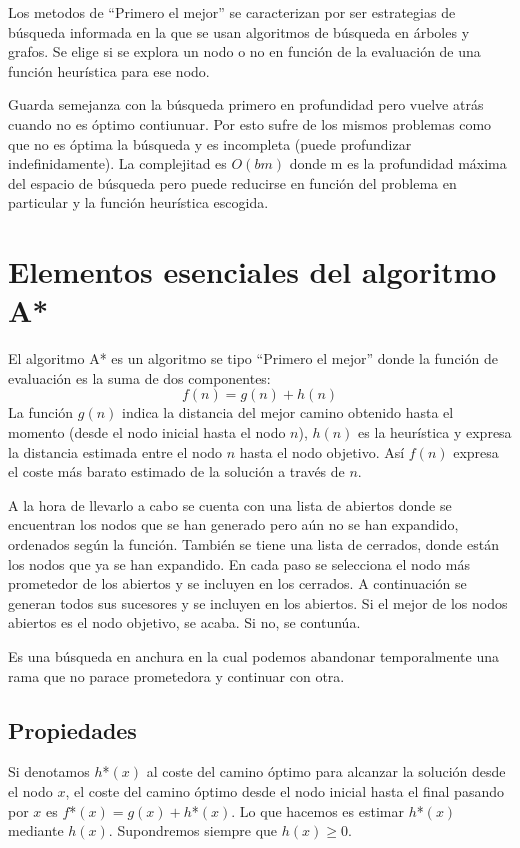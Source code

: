 \documentclass[12pt]{article}
\begin{document}
Los metodos de ``Primero el mejor'' se caracterizan por ser
estrategias de búsqueda informada en la que se usan algoritmos de
búsqueda en árboles y grafos. Se elige si se explora un nodo o no en
función de la evaluación de una función heurística para ese nodo.

Guarda semejanza con la búsqueda primero en profundidad pero vuelve
atrás cuando no es óptimo contiunuar. Por esto sufre de los mismos
problemas como que no es óptima la búsqueda y es incompleta (puede
profundizar indefinidamente). La complejitad es $O(bm)$ donde m es la
profundidad máxima del espacio de búsqueda pero puede reducirse en
función del problema en particular y la función heurística escogida.

\section{Elementos esenciales del algoritmo A*}

El algoritmo A* es un algoritmo se tipo ``Primero el mejor'' donde la
función de evaluación es la suma de dos componentes:$$f(n)=g(n)+h(n)$$
La función $g(n)$ indica la distancia del mejor camino obtenido hasta
el momento (desde el nodo inicial hasta el nodo $n$), $h(n)$ es la
heurística y expresa la distancia estimada entre el nodo $n$ hasta el
nodo objetivo. Así $f(n)$ expresa el coste más barato estimado de la
solución a través de $n$.

A la hora de llevarlo a cabo se cuenta con una lista de abiertos donde
se encuentran los nodos que se han generado pero aún no se han
expandido, ordenados según la función. También se tiene una lista de
cerrados, donde están los nodos que ya se han expandido. En cada paso
se selecciona el nodo más prometedor de los abiertos y se incluyen en
los cerrados. A continuación se generan todos sus sucesores y se
incluyen en los abiertos. Si el mejor de los nodos abiertos es el nodo
objetivo, se acaba. Si no, se contunúa.

Es una búsqueda en anchura en la cual podemos abandonar temporalmente
una rama que no parace prometedora y continuar con otra.

\subsection{Propiedades}

Si denotamos $h$*$(x)$ al coste del camino óptimo para alcanzar la
solución desde el nodo $x$, el coste del camino óptimo desde el nodo
inicial hasta el final pasando por $x$ es $f$*$(x)=g(x)+h$*$(x)$. Lo
que hacemos es estimar $h$*$(x)$ mediante $h(x)$. Supondremos siempre
que $h(x)\geq 0$.
\end{document}
